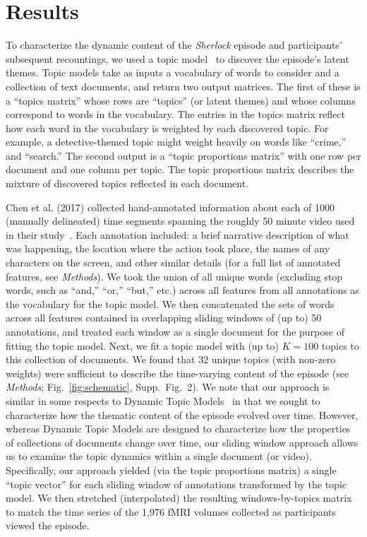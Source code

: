 \documentclass[10pt]{article}
\newcommand{\topics}{2}
\begin{document}
\section*{Results}
To characterize the dynamic content of the \textit{Sherlock} episode and participants' subsequent recountings, we used a topic model~\citep{BleiEtal03} to discover the episode's latent themes.  Topic models take as inputs a vocabulary of words to consider and a collection of text documents, and return two output matrices.  The first of these is a ``topics matrix'' whose rows are ``topics'' (or latent themes) and whose columns correspond to words in the vocabulary. The entries in the topics matrix reflect how each word in the vocabulary is weighted by each discovered topic.  For example, a detective-themed topic might weight heavily on words like ``crime,'' and ``search.''  The second output is a ``topic proportions matrix'' with one row per document and one column per topic.  The topic proportions matrix describes the mixture of discovered topics reflected in each document.

Chen et al. (2017) collected hand-annotated information about each of 1000 (manually delineated) time segments spanning the roughly 50 minute video used in their study~\cite{ChenEtal17}.  Each annotation included: a brief narrative description of what was happening, the location where the action took place, the names of any characters on the screen, and other similar details (for a full list of annotated features, see \textit{Methods}).  We took the union of all unique words (excluding stop words, such as ``and,'' ``or,'' ``but,'' etc.) across all features from all annotations as the vocabulary for the topic model.  We then concatenated the sets of words across all features contained in overlapping sliding windows of (up to) 50 annotations, and treated each window as a single document for the purpose of fitting the topic model.  Next, we fit a topic model with (up to) $K = 100$ topics to this collection of documents.  We found that 32 unique topics (with non-zero weights) were sufficient to describe the time-varying content of the episode (see \textit{Methods}; Fig.~\ref{fig:schematic}, Supp.\ Fig.~\topics).  We note that our approach is similar in some respects to Dynamic Topic Models~\citep{BleiLaff06} in that we sought to characterize how the thematic content of the episode evolved over time.  However, whereas Dynamic Topic Models are designed to characterize how the properties of collections of documents change over time, our sliding window approach allows us to examine the topic dynamics within a single document (or video).  Specifically, our approach yielded (via the topic proportions matrix) a single ``topic vector'' for each sliding window of annotations transformed by the topic model.  We then stretched (interpolated) the resulting windows-by-topics matrix to match the time series of the 1,976 fMRI volumes collected as participants viewed the episode.
\end{document}
